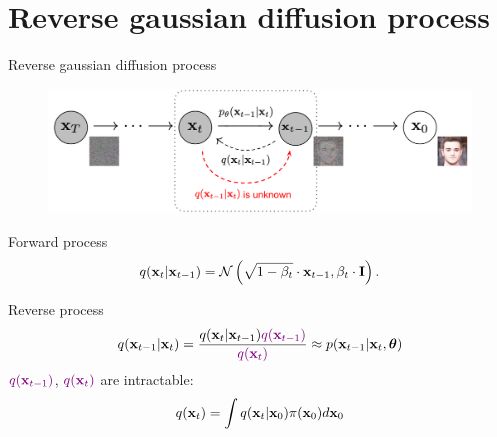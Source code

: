 \section{Reverse gaussian diffusion process}
\begin{frame}{Reverse gaussian diffusion process}
	\begin{figure}
		\includegraphics[width=0.8\linewidth]{figs/DDPM}
	\end{figure}
	\vspace{-0.5cm}
	\begin{block}{Forward process}
		\vspace{-0.3cm}
		\[
			q(\mathbf{x}_t | \mathbf{x}_{t-1}) = \mathcal{N}\left(\sqrt{1 - \beta_t} \cdot \mathbf{x}_{t-1}, \beta_t \cdot \mathbf{I}\right).
		\]
		\vspace{-0.5cm}
	\end{block}
	\begin{block}{Reverse process}
		\vspace{-0.3cm}
		\[
			q(\mathbf{x}_{t-1}|\mathbf{x}_{t}) = \frac{q(\mathbf{x}_{t}|\mathbf{x}_{t-1}) {\color{violet}q(\mathbf{x}_{t-1})}}{{\color{violet}q(\mathbf{x}_{t})}} \approx p(\mathbf{x}_{t - 1} | \mathbf{x}_t, \boldsymbol{\theta})
		\]
		\vspace{-0.3cm}
		${\color{violet}q(\mathbf{x}_{t-1})}$, ${\color{violet}q(\mathbf{x}_{t})}$ are intractable:		
		\[
			q(\mathbf{x}_{t}) = \int q(\mathbf{x}_{t} | \mathbf{x}_0) \pi(\mathbf{x}_0) d\mathbf{x}_0
		\]
	\end{block}
\end{frame}

